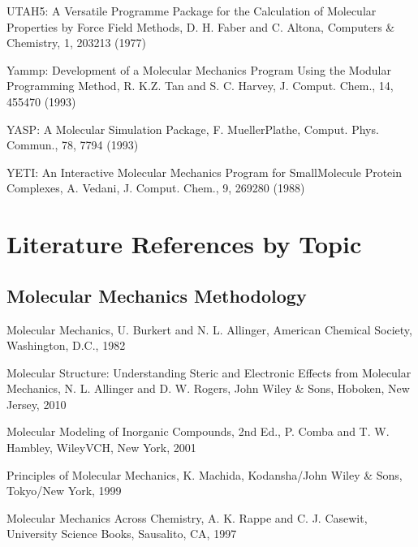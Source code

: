 \documentclass[letterpaper,11pt,english]{sphinxmanual}
\begin{document}
\sphinxAtStartPar
{}

\sphinxAtStartPar
UTAH5: A Versatile Programme Package for the Calculation of Molecular Properties by Force Field Methods, D. H. Faber and C. Altona, Computers \& Chemistry, 1, 203\sphinxhyphen{}213 (1977)

\sphinxAtStartPar
{}

\sphinxAtStartPar
Yammp: Development of a Molecular Mechanics Program Using the Modular Programming Method, R. K.\sphinxhyphen{}Z. Tan and S. C. Harvey, J. Comput. Chem., 14, 455\sphinxhyphen{}470 (1993)

\sphinxAtStartPar
{}

\sphinxAtStartPar
YASP: A Molecular Simulation Package, F. Mueller\sphinxhyphen{}Plathe, Comput. Phys. Commun., 78, 77\sphinxhyphen{}94 (1993)

\sphinxAtStartPar
{}

\sphinxAtStartPar
YETI: An Interactive Molecular Mechanics Program for Small\sphinxhyphen{}Molecule Protein Complexes, A. Vedani, J. Comput. Chem., 9, 269\sphinxhyphen{}280 (1988)


\section{Literature References by Topic}
\label{\detokenize{text/references:literature-references-by-topic}}

\subsection{Molecular Mechanics Methodology}
\label{\detokenize{text/references:molecular-mechanics-methodology}}
\sphinxAtStartPar
Molecular Mechanics, U. Burkert and N. L. Allinger, American Chemical Society, Washington, D.C., 1982

\sphinxAtStartPar
Molecular Structure: Understanding Steric and Electronic Effects from Molecular Mechanics, N. L. Allinger and D. W. Rogers, John Wiley \& Sons, Hoboken, New Jersey, 2010

\sphinxAtStartPar
Molecular Modeling of Inorganic Compounds, 2nd Ed., P. Comba and T. W. Hambley, Wiley\sphinxhyphen{}VCH, New York, 2001

\sphinxAtStartPar
Principles of Molecular Mechanics, K. Machida, Kodansha/John Wiley \& Sons, Tokyo/New York, 1999

\sphinxAtStartPar
Molecular Mechanics Across Chemistry, A. K. Rappe and C. J. Casewit, University Science Books, Sausalito, CA, 1997
\end{document}
